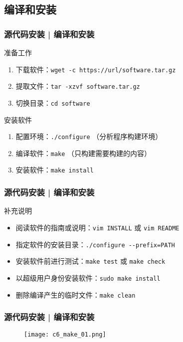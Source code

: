 \subsection{编译和安装}
\begin{frame}[fragile]
  \frametitle{源代码安装 | \alert{编译和安装}}
  \begin{block}{准备工作}
    \begin{enumerate}
      \item 下载软件：\verb|wget -c https://url/software.tar.gz|
      \item 提取文件：\verb|tar -xzvf software.tar.gz|
      \item 切换目录：\verb|cd software|
    \end{enumerate}
  \end{block}
  \pause
  \begin{block}{安装软件}
    \begin{enumerate}
      \item 配置环境：\verb|./configure| （分析程序构建环境）
      \item 编译软件：\verb|make| （只构建需要构建的内容）
      \item 安装软件：\verb|make install|
    \end{enumerate}
  \end{block}
\end{frame}

\begin{frame}[fragile]
  \frametitle{源代码安装 | 编译和安装}
  \begin{block}{补充说明}
    \begin{itemize}
      \item 阅读软件的指南或说明：\verb|vim INSTALL| 或 \verb|vim README|
      \item 指定软件的安装目录：\verb|./configure --prefix=PATH|
      \item 安装软件前进行测试：\verb|make test| 或 \verb|make check|
      \item 以超级用户身份安装软件：\verb|sudo make install|
      \item 删除编译产生的临时文件：\verb|make clean|
    \end{itemize}
  \end{block}
\end{frame}

\begin{frame}
  \frametitle{源代码安装 | 编译和安装}
  \begin{figure}
    \centering
    \texttt{[image: c6\_make\_01.png]}
  \end{figure}
\end{frame}

